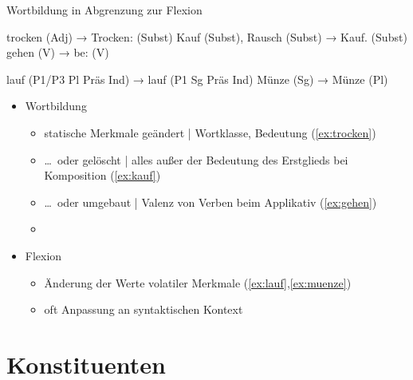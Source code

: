 \begin{frame}
  {Wortbildung in Abgrenzung zur Flexion}
  \pause
  \begin{exe}
    \ex
    \begin{xlist}
      \ex trocken (Adj) → \alert{Trocken}: (Subst)\label{ex:trocken}
      \ex Kauf (Subst), Rausch (Subst) → \alert{Kauf}. (Subst)\label{ex:kauf}
      \ex gehen (V) → \alert{be}: (V)\label{ex:gehen}
    \end{xlist}
    \pause
    \ex
    \begin{xlist}
      \ex \alert{lauf} (P1\slash P3 Pl Präs Ind) → \alert{lauf} (P1 Sg Präs Ind)\label{ex:lauf}
      \ex \alert{Münze} (Sg) → \alert{Münze} (Pl)\label{ex:muenze}
    \end{xlist}
  \end{exe}
  \pause
  \Halbzeile
  \begin{itemize}[<+->]
    \item Wortbildung
      \begin{itemize}[<+->]
        \item statische Merkmale geändert | Wortklasse, Bedeutung \alert{(\ref{ex:trocken})}
        \item \ldots\ oder gelöscht | alles außer der Bedeutung des Erstglieds bei Komposition \alert{(\ref{ex:kauf})}
        \item \ldots\ oder umgebaut | Valenz von Verben beim Applikativ \alert{(\ref{ex:gehen})}
        \item {}
      \end{itemize}
  \Halbzeile
    \item Flexion
      \begin{itemize}
        \item Änderung der Werte volatiler Merkmale \alert{(\ref{ex:lauf},\ref{ex:muenze})}
        \item \alert{oft Anpassung an syntaktischen Kontext}
      \end{itemize}
  \end{itemize}
\end{frame}


\section{Konstituenten}


